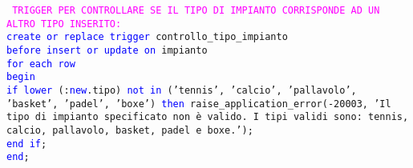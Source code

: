\documentclass{article}
\begin{document}
    \begin{flushleft}
        \texttt{
        \textcolor{magenta}{TRIGGER PER CONTROLLARE SE IL TIPO DI IMPIANTO CORRISPONDE AD UN ALTRO TIPO \hspace*{0.5em}INSERITO:} \\
        \hspace*{2em} \textcolor{blue}{create or replace trigger} controllo\_tipo\_impianto \\
        \hspace*{2em} \textcolor{blue}{before insert or update on} impianto \\
        \hspace*{2em} \textcolor{blue}{for each row} \\
        \hspace*{2em} \textcolor{blue}{begin} \\
        \hspace*{4.4em}\textcolor{blue}{if lower} (:\textcolor{blue}{new}.tipo) \textcolor{blue}{not in} ('tennis', 'calcio', 'pallavolo', 'basket', \hspace*{4.2em}'padel', 'boxe') \textcolor{blue}{then} raise\_application\_error(-20003, 'Il tipo di \hspace*{4.4em}impianto specificato non è valido. I tipi validi sono: tennis, calcio, \hspace*{4.5em}pallavolo, basket, padel e boxe.');\\
        \hspace*{4em} \textcolor{blue}{end if}; \\
        \hspace*{2em} \textcolor{blue}{end}; \\}
    \end{flushleft}
\end{document}
